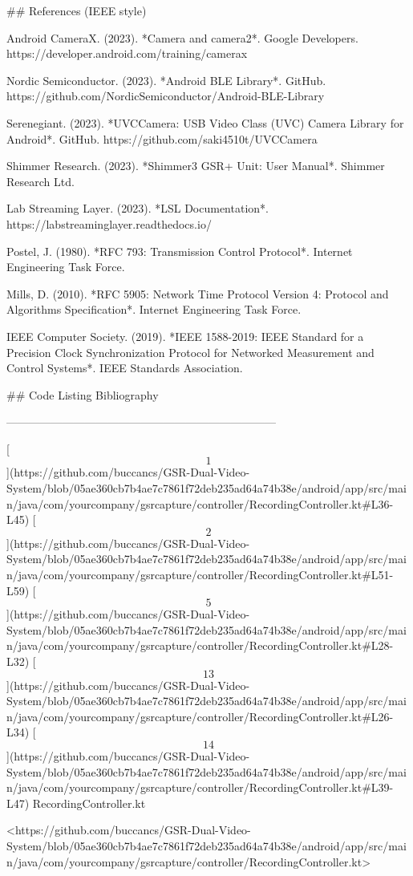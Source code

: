 \documentclass[12pt,a4paper]{article}
\begin{document}
{## References (IEEE style)

Android CameraX. (2023). *Camera and camera2*. Google Developers. https://developer.android.com/training/camerax

Nordic Semiconductor. (2023). *Android BLE Library*. GitHub. https://github.com/NordicSemiconductor/Android-BLE-Library

Serenegiant. (2023). *UVCCamera: USB Video Class (UVC) Camera Library for Android*. GitHub. https://github.com/saki4510t/UVCCamera

Shimmer Research. (2023). *Shimmer3 GSR+ Unit: User Manual*. Shimmer Research Ltd.

Lab Streaming Layer. (2023). *LSL Documentation*. https://labstreaminglayer.readthedocs.io/

Postel, J. (1980). *RFC 793: Transmission Control Protocol*. Internet Engineering Task Force.

Mills, D. (2010). *RFC 5905: Network Time Protocol Version 4: Protocol and Algorithms Specification*. Internet Engineering Task Force.

IEEE Computer Society. (2019). *IEEE 1588-2019: IEEE Standard for a Precision Clock Synchronization Protocol for Networked Measurement and Control Systems*. IEEE Standards Association.

## Code Listing Bibliography

------------------------------------------------------------------------

[\[1\]](https://github.com/buccancs/GSR-Dual-Video-System/blob/05ae360cb7b4ae7c7861f72deb235ad64a74b38e/android/app/src/main/java/com/yourcompany/gsrcapture/controller/RecordingController.kt#L36-L45)
[\[2\]](https://github.com/buccancs/GSR-Dual-Video-System/blob/05ae360cb7b4ae7c7861f72deb235ad64a74b38e/android/app/src/main/java/com/yourcompany/gsrcapture/controller/RecordingController.kt#L51-L59)
[\[5\]](https://github.com/buccancs/GSR-Dual-Video-System/blob/05ae360cb7b4ae7c7861f72deb235ad64a74b38e/android/app/src/main/java/com/yourcompany/gsrcapture/controller/RecordingController.kt#L28-L32)
[\[13\]](https://github.com/buccancs/GSR-Dual-Video-System/blob/05ae360cb7b4ae7c7861f72deb235ad64a74b38e/android/app/src/main/java/com/yourcompany/gsrcapture/controller/RecordingController.kt#L26-L34)
[\[14\]](https://github.com/buccancs/GSR-Dual-Video-System/blob/05ae360cb7b4ae7c7861f72deb235ad64a74b38e/android/app/src/main/java/com/yourcompany/gsrcapture/controller/RecordingController.kt#L39-L47)
RecordingController.kt

<https://github.com/buccancs/GSR-Dual-Video-System/blob/05ae360cb7b4ae7c7861f72deb235ad64a74b38e/android/app/src/main/java/com/yourcompany/gsrcapture/controller/RecordingController.kt>

}
\end{document}
